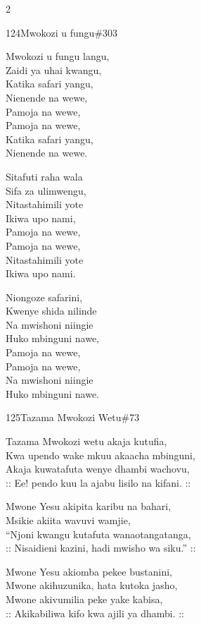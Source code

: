 \begin{multicols}{2}
\begin{hymn}{124}{Mwokozi u fungu}{\#303}
\begin{stanza}
Mwokozi u fungu langu,\\
Zaidi ya uhai kwangu,\\
Katika safari yangu,\\
Nienende na wewe,\\
Pamoja na wewe,\\
Pamoja na wewe,\\
Katika safari yangu,\\
Nienende na wewe.
\end{stanza}
\begin{stanza}
Sitafuti raha wala\\
Sifa za ulimwengu,\\
Nitastahimili yote\\
Ikiwa upo nami,\\
Pamoja na wewe,\\
Pamoja na wewe,\\
Nitastahimili yote\\
Ikiwa upo nami.
\end{stanza}
\begin{stanza}
Niongoze safarini,\\
Kwenye shida nilinde\\
Na mwishoni niingie\\
Huko mbinguni nawe,\\
Pamoja na wewe,\\
Pamoja na wewe,\\
Na mwishoni niingie\\
Huko mbinguni nawe.
\end{stanza}
\end{hymn}

\begin{hymn}{125}{Tazama Mwokozi Wetu}{\#73}
\begin{stanza}
Tazama Mwokozi wetu akaja kutufia,\\
Kwa upendo wake mkuu akaacha mbinguni,\\
Akaja kuwatafuta wenye dhambi wachovu,\\
:: Ee! pendo kuu la ajabu lisilo na kifani. ::
\end{stanza}
\begin{stanza}
Mwone Yesu akipita karibu na bahari,\\
Msikie akiita wavuvi wamjie,\\
``Njoni kwangu kutafuta wanaotangatanga,\\
:: Nisaidieni kazini, hadi mwisho wa siku.'' ::
\end{stanza}
\begin{stanza}
Mwone Yesu akiomba pekee bustanini,\\
Mwone akihuzunika, hata kutoka jasho,\\
Mwone akivumilia peke yake kabisa,\\
:: Akikabiliwa kifo kwa ajili ya dhambi. ::
\end{stanza}
\end{hymn}


\end{multicols}
